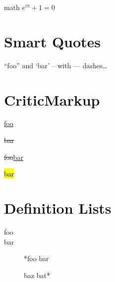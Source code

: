 math ${e}^{i\pi }+1=0$

\part{Smart Quotes }
\label{smartquotes}

``foo'' and `bar' -- with --- dashes{\ldots}

\part{CriticMarkup }
\label{criticmarkup}

\underline{foo}

\sout{bar}

\sout{foo}\underline{bar}


\hl{bar}

\part{Definition Lists }
\label{definitionlists}

\begin{description}
\item[foo]
\item[bar]
*foo bar

baz bat*
\end{description}
